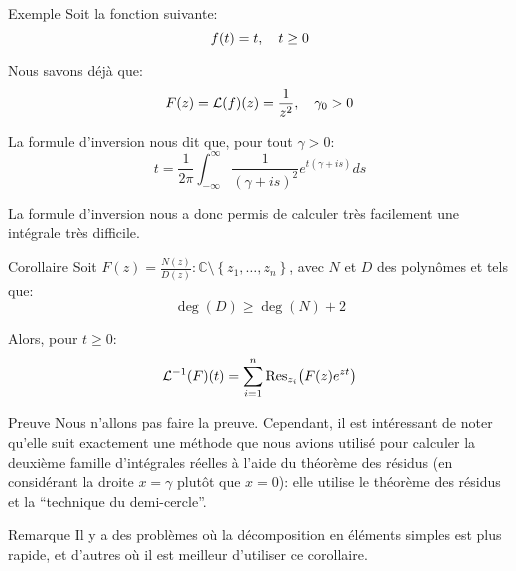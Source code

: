\documentclass[a4paper]{article}
\begin{document}
\begin{parag}{Exemple}
    Soit la fonction suivante: 
    \[f\left(t\right) = t, \mathspace t \geq 0\]
    
    Nous savons déjà que: 
    \[F\left(z\right) = \mathcal{L}\left(f\right)\left(z\right) = \frac{1}{z^2}, \mathspace \gamma_0 > 0\]
    
    La formule d'inversion nous dit que, pour tout $\gamma > 0$: 
    \[t = \frac{1}{2\pi} \int_{-\infty}^{\infty} \frac{1}{\left(\gamma + is\right)^2} e^{t\left(\gamma + is\right)}ds\]
    
    La formule d'inversion nous a donc permis de calculer très facilement une intégrale très difficile.
\end{parag}

\begin{parag}{Corollaire}
    Soit $F\left(z\right) = \frac{N\left(z\right)}{D\left(z\right)}: \mathbb{C} \setminus \left\{z_1, \ldots, z_n\right\}$, avec $N$ et $D$ des polynômes et tels que:
    \[\deg\left(D\right) \geq \deg\left(N\right) + 2\]

    Alors, pour $t \geq 0$: 
    \[\mathcal{L}^{-1}\left(F\right)\left(t\right) = \sum_{i=1}^{n} \Res_{z_i}\left(F\left(z\right) e^{zt}\right)\]

    \begin{subparag}{Preuve}
        Nous n'allons pas faire la preuve. Cependant, il est intéressant de noter qu'elle suit exactement une méthode que nous avions utilisé pour calculer la deuxième famille d'intégrales réelles à l'aide du théorème des résidus (en considérant la droite $x = \gamma$ plutôt que $x = 0$): elle utilise le théorème des résidus et la ``technique du demi-cercle''. 
    \end{subparag}

    \begin{subparag}{Remarque}
        Il y a des problèmes où la décomposition en éléments simples est plus rapide, et d'autres où il est meilleur d'utiliser ce corollaire.
    \end{subparag}
\end{parag}
\end{document}
